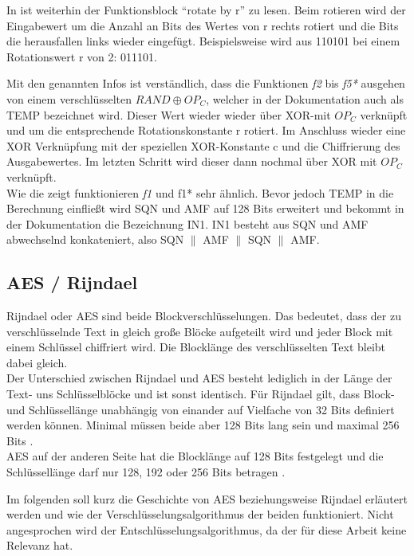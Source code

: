  In  ist weiterhin der Funktionsblock ``rotate by r'' zu lesen.
 Beim rotieren wird der Eingabewert um die Anzahl an Bits des Wertes von r rechts rotiert und
 die Bits die herausfallen links wieder eingefügt. Beispielsweise wird aus 110101 bei einem
 Rotationswert r von 2: 011101.
 
 Mit den genannten Infos ist verständlich, dass die Funktionen \emph{f2} bis \emph{f5*}
 ausgehen von einem verschlüsselten $RAND \oplus OP_C$, welcher in der Dokumentation
 auch als TEMP bezeichnet wird. Dieser Wert wieder wieder über XOR-mit $OP_ C$ verknüpft
 und um die entsprechende Rotationskonstante r rotiert. Im Anschluss wieder eine XOR
 Verknüpfung mit der speziellen XOR-Konstante c und die Chiffrierung des Ausgabewertes. Im
 letzten Schritt wird dieser dann nochmal über XOR mit $OP_{C}$ verknüpft. \\
 Wie die  zeigt funktionieren \emph{f1} und {f1*} sehr
 ähnlich. Bevor jedoch TEMP in die Berechnung einfließt wird SQN und AMF auf 128 Bits
 erweitert und bekommt in der Dokumentation die Bezeichnung IN1. IN1 besteht aus SQN und
 AMF abwechselnd konkateniert, also SQN $\|$ AMF $\|$ SQN $\|$ AMF. \cite{3gpp.33.102}
 
\subsection{AES / Rijndael}
\label{aes}
 Rijndael oder \ac{AES} sind beide Blockverschlüsselungen. Das bedeutet, dass der zu
 verschlüsselnde Text in gleich große Blöcke aufgeteilt wird und jeder Block mit einem Schlüssel
 chiffriert wird. Die Blocklänge des verschlüsselten Text bleibt dabei gleich. \\
 Der Unterschied zwischen Rijndael und AES besteht lediglich in der Länge der Text- uns
 Schlüsselblöcke und ist sonst identisch. Für Rijndael gilt, dass Block- und Schlüssellänge
 unabhängig von einander auf Vielfache von 32 Bits definiert werden können. Minimal müssen
 beide aber 128 Bits lang sein und maximal 256 Bits \cite{daemon02}. \\
 AES auf der anderen Seite hat die Blocklänge auf 128 Bits festgelegt und die Schlüssel\-länge
 darf nur 128, 192 oder 256 Bits betragen \cite{AES-FIPS}.
 
 Im folgenden soll kurz die Geschichte von AES beziehungsweise Rijndael erläutert werden und
 wie der Verschlüsselungs\-algorithmus der beiden funktioniert. Nicht angesprochen wird der
 Entschlüsselungs\-algorithmus, da der für diese Arbeit keine Relevanz hat.
 
